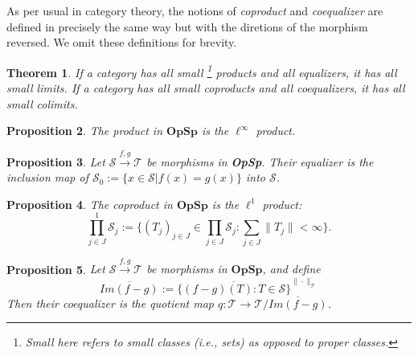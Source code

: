 \documentclass[12pt]{article}
\newtheorem{theorem}{Theorem}[section]
\newtheorem{proposition}[theorem]{Proposition}
\theoremstyle{definition}
\newcommand{\mc}[1]{\mathcal{#1}}
\newcommand{\<}{\langle}
\renewcommand{\>}{\rangle}
\begin{document}
As per usual in category theory, the notions of \textit{coproduct} and \textit{coequalizer} are defined in precisely the same way but with the diretions of the morphism reversed. We omit these definitions for brevity.

\begin{theorem}  \label{thm: products-equalizers}
    If a category has all small \footnote{\textit{Small} here refers to small classes (i.e., sets) as opposed to proper classes.} products and all equalizers, it has all small limits. If a category has all small coproducts and all coequalizers, it has all small colimits. 
\end{theorem}

\begin{proposition} 
    The product in $\textbf{OpSp}$ is the $\ell^\infty$ product. 
\end{proposition}

\begin{proposition} 
    Let $\mc S \overset{f,g}{\to} \mc T$ be morphisms in \textbf{OpSp}. Their equalizer is the inclusion map of $\mc S_0 := \{ x \in \mc S | f(x) = g(x)\}$ into $\mc S$.
\end{proposition}

\begin{proposition} 
    The coproduct in $\textbf{OpSp}$ is the $\ell^1$ product:
    \[
    \prod_{j \in J}^{1} \mc S_j := \bigg\{ (T_j)_{j \in J} \in \prod_{j \in J} \mc S_j : \sum_{j \in J} \|T_j\| < \infty\bigg\}.
    \]
\end{proposition}

\begin{proposition} 
    Let $\mc S \overset{f,g}{\to} \mc T$ be morphisms in $\textbf{OpSp}$, and define 
    \[
    \overline{Im(f-g)}:= \overline{\{(f-g)(T) : T \in \mc S\}}^{\|\cdot\|_{\mc T}}
    \]
    Then their coequalizer is the quotient map $q: \mc T \to \mc T/\overline{Im(f-g)}$.
\end{proposition}   
\end{document}
